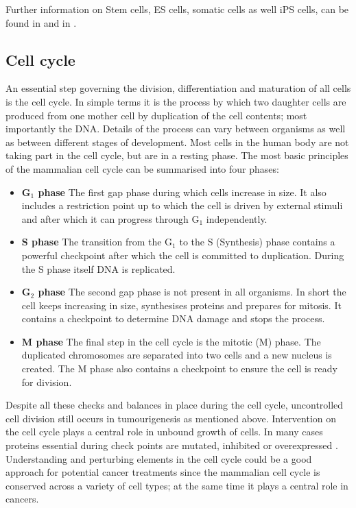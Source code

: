 Further information on Stem cells, ES cells, somatic cells as well iPS cells, can be found in \cite{lanza2009essentials} and in \cite{Lanza:2013uk}. 

\subsection{Cell cycle}
\label{sec:cell-cycle}

An essential step governing the division, differentiation and maturation of all cells is the cell cycle. In simple terms it is the process by which two daughter cells are produced from one mother cell by duplication of the cell contents; most importantly the DNA. Details of the process can vary between organisms as well as between different stages of development. Most cells in the human body are not taking part in the cell cycle, but are in a resting phase. The most basic principles of the mammalian cell cycle can be summarised into four phases:

\begin{itemize}
\item {\bf G$_1$ phase} The first gap phase during which cells increase in size. It also includes a restriction point up to which the cell is driven by external stimuli and after which it can progress through G$_1$ independently. 
\item {\bf S phase} The transition from the G$_1$ to the S (Synthesis) phase contains a powerful checkpoint after which the cell is committed to duplication. During the S phase itself DNA is replicated.
\item {\bf G$_2$ phase} The second gap phase is not present in all organisms. In short the cell keeps increasing in size, synthesises proteins and prepares for mitosis. It contains a checkpoint to determine DNA damage and stops the process. 
\item {\bf M phase} The final step in the cell cycle is the mitotic (M) phase. The duplicated chromosomes are separated into two cells and a new nucleus is created. The M phase also contains a checkpoint to ensure the cell is ready for division.
\end{itemize}

Despite all these checks and balances in place during the cell cycle, uncontrolled cell division  still occurs in tumourigenesis as mentioned above. Intervention on the cell cycle plays a central role in unbound growth of cells. In many cases proteins essential during check points are mutated, inhibited or overexpressed \citep{Williams:2012eg}. Understanding and perturbing elements in the cell cycle could be a good approach for potential cancer treatments since the mammalian cell cycle is conserved across a variety of cell types; at the same time it plays a central role in cancers. 


